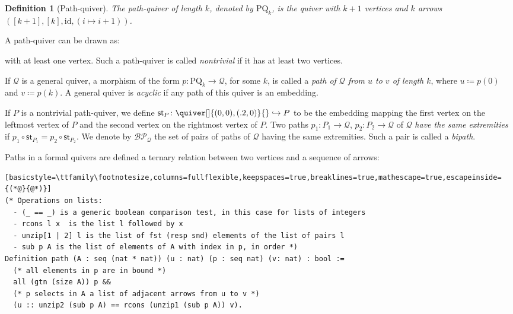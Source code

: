 \documentclass[10pt,a4paper]{article}
\newtheorem{definition}[theorem]{Definition}
\renewcommand{\~}{\widetilde}
\newcommand{\Q}{\mathcal Q}
\newcommand{\BP}{\mathcal{BP}}
\newcommand{\PQ}{\mathrm{PQ}}
\newcommand{\id}{\mathrm{id}}
\newcommand{\sot}{\textsf{st}}
\begin{document}
\begin{definition}[Path-quiver]\label{def:pathquiv}
  The \emph{path-quiver of length $k$}, denoted by $\PQ_k$, is the quiver
  with $k+1$ vertices and $k$ arrows $([k+1], [k], \id, (i \mapsto i + 1))$.
\end{definition}

A path-quiver can be drawn as:
\begin{center} 
\end{center}
with at least one vertex. Such a path-quiver is called \emph{nontrivial} if it has at least two vertices.

If $\Q$ is a general quiver, a morphism of the form $p\colon \PQ_k \to \Q$, for some $k$, is called a \emph{path of\/ $\Q$ from $u$ to $v$ of length $k$}, where $u \coloneqq p(0)$ and $v \coloneqq p(k)$. A general quiver is \emph{acyclic} if any path of this quiver is an embedding.

If $P$ is a nontrivial path-quiver, we define $\sot_P\colon \quiver[]{(0,0),(.2,0)}{} \hookrightarrow P$ to be the embedding mapping the first vertex on the leftmost vertex of $P$ and the second vertex on the rightmost vertex of $P$. Two paths $p_1\colon P_1 \to \Q$, $p_2\colon P_2 \to \Q$ of $\Q$ \emph{have the same extremities} if $p_1 \circ \sot_{P_1} = p_2 \circ \sot_{P_2}$. We denote by $\BP_{\!\Q}$ the set of pairs of paths of $\Q$ having the same extremities. Such a pair is called a \emph{bipath}.

Paths in a formal quivers are defined a ternary relation between two vertices and a sequence of arrows:
\begin{lstlisting}[basicstyle=\ttfamily\footnotesize,columns=fullflexible,keepspaces=true,breaklines=true,mathescape=true,escapeinside={(*@}{@*)}]
(* Operations on lists:
  - (_ == _) is a generic boolean comparison test, in this case for lists of integers
  - rcons l x  is the list l followed by x
  - unzip[1 | 2] l is the list of fst (resp snd) elements of the list of pairs l
  - sub p A is the list of elements of A with index in p, in order *)
Definition path (A : seq (nat * nat)) (u : nat) (p : seq nat) (v: nat) : bool :=
  (* all elements in p are in bound *)
  all (gtn (size A)) p &&
  (* p selects in A a list of adjacent arrows from u to v *)
  (u :: unzip2 (sub p A) == rcons (unzip1 (sub p A)) v).
\end{lstlisting}
\end{document}
